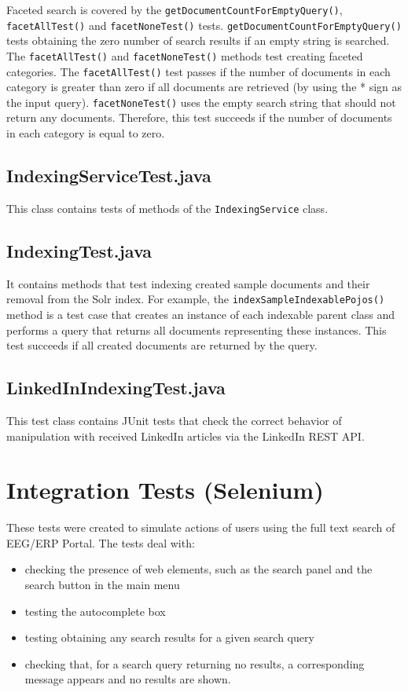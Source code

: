 Faceted search is covered by the \texttt{get\-Document\-Count\-For\-Empty\-Query()}, \texttt{facet\-All\-Test()} and \texttt{facet\-None\-Test()} tests.
\texttt{getDocumentCountForEmptyQuery()} tests obtaining the zero number of search results if an empty string is searched.
The \texttt{facet\-All\-Test()} and \texttt{facet\-None\-Test()} methods test creating faceted categories.
The \texttt{facetAllTest()} test passes if the number of documents in each category is greater than zero if all documents are retrieved (by using the * sign as the input query). 
\texttt{facetNoneTest()} uses the empty search string that should not return any documents. Therefore, this test succeeds if the number of documents in each category is equal to zero.

\subsection{IndexingServiceTest.java}

This class contains tests of methods of the \texttt{IndexingService} class.

\subsection{IndexingTest.java}

It contains methods that test indexing created sample documents and their removal from the Solr index.
For example, the \texttt{indexSampleIndexablePojos()} method is a test case that creates an instance of each indexable parent class and performs a query that returns all documents representing these instances. This test succeeds if all created documents are returned by the query.

\subsection{LinkedInIndexingTest.java}

This test class contains JUnit tests that check the correct behavior of manipulation with received LinkedIn articles via the LinkedIn REST API.

\section{Integration Tests (Selenium)}

These tests were created to simulate actions of users using the full text search of EEG/ERP Portal. 
The tests deal with:

\begin{itemize}
	\item checking the presence of web elements, such as the search panel and the search button in the main menu
	\item testing the autocomplete box
	\item testing obtaining any search results for a given search query
	\item checking that, for a search query returning no results, a corresponding message appears and no results are shown.
\end{itemize}


